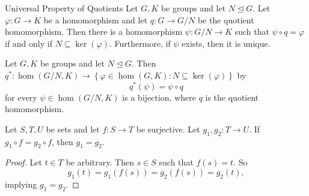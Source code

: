 \documentclass[pmath347]{subfiles}
\begin{document}
    \begin{theorem}{Universal Property of Quotients}
        Let $G,K$ be groups and let $N\trianglelefteq G$. Let $\varphi:G\to K$ be a homomorphism and let $q:G\to G /N$ be the quotient homomorphism. Then there is a homomorphism $\psi:G /N\to K$ such that $\psi\circ q=\varphi$ if and only if $N\subseteq\ker\left( \varphi \right)$. Furthermore, if $\psi$ exists, then it is unique. 
    \end{theorem}

    \begin{cor}{}
        Let $G,K$ be groups and let $N\trianglelefteq G$. Then $q^{*} : \hom\left( G /N, K \right) \to \left\lbrace \varphi\in \hom\left( G,K \right) : N\subseteq\ker\left( \varphi \right)  \right\rbrace$ by
        \begin{equation*}
            q^{*} \left( \psi \right) = \psi\circ q
        \end{equation*}
        for every $\psi\in\hom\left( G /N,K \right)$ is a bijection, where $q$ is the quotient homomorphism.
    \end{cor}	

    \clearpage
    \begin{lemma_inside}{}
        Let $S,T,U$ be sets and let $f:S\to T$ be surjective. Let $g_1,g_2:T\to U$. If $g_1\circ f = g_2\circ f$, then $g_1=g_2$.
    \end{lemma_inside}

    \begin{proof}
        Let $t\in T$ be arbitrary. Then $s\in S$ such that $f\left( s \right) = t$. So
        \begin{equation*}
            g_1\left( t \right) = g_1\left( f\left( s \right)  \right) = g_2\left( f\left( s \right)  \right) = g_2\left( t \right) ,
        \end{equation*}
        implying $g_1=g_2$.
    \end{proof}
\end{document}
